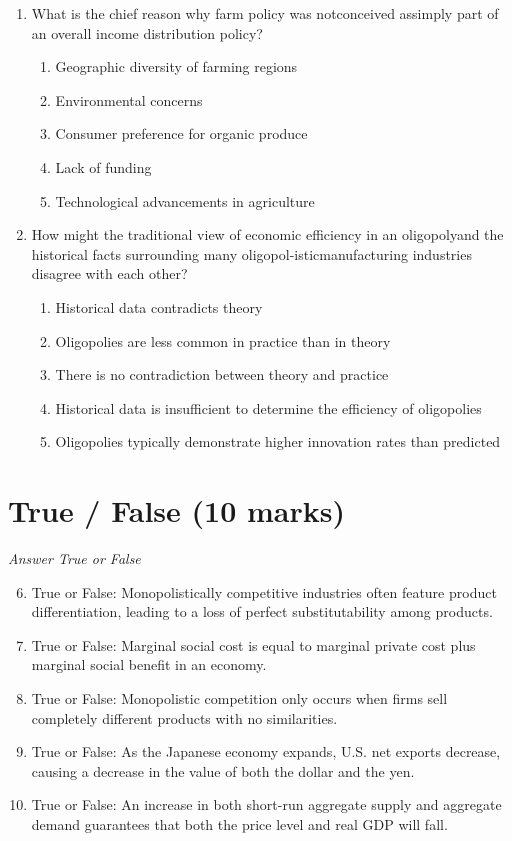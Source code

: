 \documentclass[12pt]{article}
\begin{document}
\begin{enumerate}[label=\arabic*.]
\begin{enumerate}[label=(\alph*)]
    \item value of other currencies will fall.
\end{enumerate}
\item What is the chief reason why farm policy was notconceived assimply part of an overall income distribution policy?
\begin{enumerate}[label=(\alph*)]
    \item Geographic diversity of farming regions
    \item Environmental concerns
    \item Consumer preference for organic produce
    \item Lack of funding
    \item Technological advancements in agriculture
\end{enumerate}
\item How might the traditional view of economic efficiency in an oligopolyand the historical facts surrounding many oligopol-isticmanufacturing industries disagree with each other?
\begin{enumerate}[label=(\alph*)]
    \item Historical data contradicts theory
    \item Oligopolies are less common in practice than in theory
    \item There is no contradiction between theory and practice
    \item Historical data is insufficient to determine the efficiency of oligopolies
    \item Oligopolies typically demonstrate higher innovation rates than predicted
\end{enumerate}
\end{enumerate}

\section*{True / False (10 marks)}
\textit{Answer True or False}
\begin{enumerate}[label=\arabic*.]
\setcounter{enumi}{5}
\item True or False: Monopolistically competitive industries often feature product differentiation, leading to a loss of perfect substitutability among products.
\item True or False: Marginal social cost is equal to marginal private cost plus marginal social benefit in an economy.
\item True or False: Monopolistic competition only occurs when firms sell completely different products with no similarities.
\item True or False: As the Japanese economy expands, U.S. net exports decrease, causing a decrease in the value of both the dollar and the yen.
\item True or False: An increase in both short-run aggregate supply and aggregate demand guarantees that both the price level and real GDP will fall.
\end{enumerate}
\end{document}
